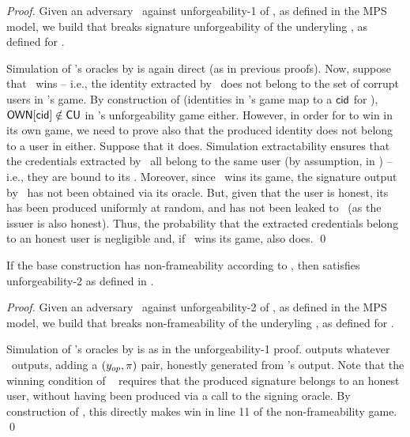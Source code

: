 \begin{proof}
  Given an adversary \adv~against unforgeability-1 of \CUASMPS, as defined in
  the MPS model, we build \advB that breaks signature unforgeability of the
  underyling \CUASGen, as defined for \UAS.

  Simulation of \adv's oracles by \advB is again direct (as in previous proofs).
  Now, suppose that \adv~wins -- i.e., the identity extracted by \adv~does not
  belong to the set of corrupt users in \adv's game. By construction of \advB
  (identities in \adv's game map to a $\mathsf{cid}$ for \advB), $\mathsf{OWN}[\mathsf{cid}] \notin
  \mathsf{CU}$ in \advB's unforgeability game either.
  However, in order for \advB to win in its own game, we need to prove also that
  the produced identity does not belong to a user in \HU either. Suppose that it
  does. Simulation extractability ensures that the credentials extracted by
  \adv~all belong to the same user (by assumption, in \HU) -- i.e., they are
  bound to its \usk. Moreover, since \adv~wins its game, the signature output by
  \adv~has not been obtained via its \SIGN oracle. But, given that the user is
  honest, its \usk has been produced uniformly at random, and has not been
  leaked to \adv~(as the issuer is also honest). Thus, the probability that
  the extracted credentials belong to an honest user is negligible and, if
  \adv~wins its game, \advB also does.
  \qed
\end{proof}

\begin{theorem}
  If the base \CUASGen construction has non-frameability according to
  , then \CUASMPS satisfies unforgeability-2 as
  defined in \cite{ngsy22}.
\end{theorem}

\begin{proof}
  Given an adversary \adv~against unforgeability-2 of \CUASMPS, as defined in
  the MPS model, we build \advB that breaks non-frameability of the underyling
  \CUASGen, as defined for \UAS.

  Simulation of \adv's oracles by \advB is as in the unforgeability-1 proof.
  \advB outputs whatever \adv~outputs, adding a $(y_{op},\pi)$ pair, honestly
  generated from \adv's output. Note that the winning condition of \adv~
  requires that the produced signature belongs to an honest user, without
  having been produced via a call to the signing oracle. By construction of
  \advB, this directly makes \advB win in line 11 of the non-frameability game.
  \qed
\end{proof}

